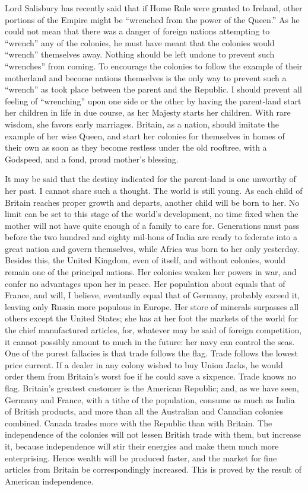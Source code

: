 \documentclass[11pt,openany]{book}
\begin{document}
Lord Salisbury has recently said that if Home Rule were granted to Ireland, other portions of the Empire might be ``wrenched from the power of the Queen.'' As he could not mean that there was a danger of foreign nations attempting to ``wrench'' any of the colonies, he must have meant that the colonies would ``wrench'' themselves away. Nothing should be left undone to prevent such ``wrenches'' from coming. To encourage the colonies to follow the example of their motherland and become nations themselves is the only way to prevent such a ``wrench'' as took place between the parent and the Republic. I should prevent all feeling of ``wrenching'' upon one side or the other by having the parent-land start her children in life in due course, as her Majesty starts her children. With rare wisdom, she favors early marriages. Britain, as a nation, should imitate the example of her wise Queen, and start her colonies for themselves in homes of their own as soon as they become restless under the old rooftree, with a Godspeed, and a fond, proud mother's blessing.

It may be said that the destiny indicated for the parent-land is one unworthy of her past. I cannot share such a thought. The world is still young. As each child of Britain reaches proper growth and departs, another child will be born to her. No limit can be set to this stage of the world's development, no time fixed when the mother will not have quite enough of a family to care for. Generations must pass before the two hundred and eighty mil-hons of India are ready to federate into a great nation and govern themselves, while Africa was born to her only yesterday. Besides this, the United Kingdom, even of itself, and without colonies, would remain one of the principal nations. Her colonies weaken her powers in war, and confer no advantages upon her in peace. Her population about equals that of France, and will, I believe, eventually equal that of Germany, probably exceed it, leaving only Russia more populous in Europe. Her store of minerals surpasses all others except the United States; she has at her foot the markets of the world for the chief manufactured articles, for, whatever may be said of foreign competition, it cannot possibly amount to much in the future: her navy can control the seas. One of the purest fallacies is that trade follows the flag. Trade follows the lowest price current. If a dealer in any colony wished to buy Union Jacks, he would order them from Britain's worst foe if he could save a sixpence. Trade knows no flag. Britain's greatest customer is the American Republic; and, as we have seen, Germany and France, with a tithe of the population, consume as much as India of British products, and more than all the Australian and Canadian colonies combined. Canada trades more with the Republic than with Britain. The independence of the colonies will not lessen British trade with them, but increase it, because independence will stir their energies and make them much more enterprising. Hence wealth will be produced faster, and the market for fine articles from Britain be correspondingly increased. This is proved by the result of American independence.
\end{document}
